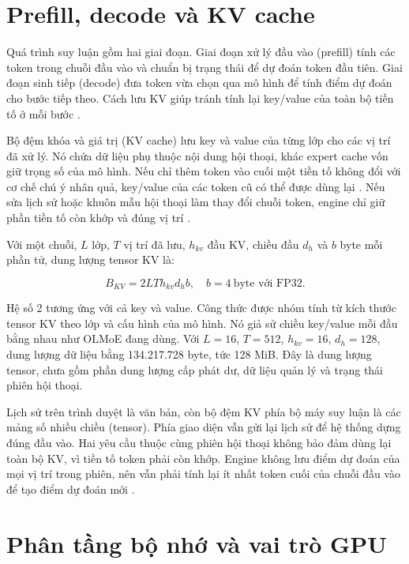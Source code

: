 \section{Prefill, decode và KV cache}

Quá trình suy luận gồm hai giai đoạn. Giai đoạn xử lý đầu vào (prefill) tính các token trong chuỗi đầu vào và chuẩn bị trạng thái để dự đoán token đầu tiên. Giai đoạn sinh tiếp (decode) đưa token vừa chọn qua mô hình để tính điểm dự đoán cho bước tiếp theo. Cách lưu KV giúp tránh tính lại key/value của toàn bộ tiền tố ở mỗi bước \cite{hf_kv_cache}.

Bộ đệm khóa và giá trị (KV cache) lưu key và value của từng lớp cho các vị trí đã xử lý. Nó chứa dữ liệu phụ thuộc nội dung hội thoại, khác expert cache vốn giữ trọng số của mô hình. Nếu chỉ thêm token vào cuối một tiền tố không đổi với cơ chế chú ý nhân quả, key/value của các token cũ có thể được dùng lại \cite{hf_kv_cache}. Nếu sửa lịch sử hoặc khuôn mẫu hội thoại làm thay đổi chuỗi token, engine chỉ giữ phần tiền tố còn khớp và đúng vị trí \cite{moe_tierengine_arch}.

Với một chuỗi, $L$ lớp, $T$ vị trí đã lưu, $h_{kv}$ đầu KV, chiều đầu $d_h$ và $b$ byte mỗi phần tử, dung lượng tensor KV là:

\begin{equation}
\label{eq:2.9}
B_{KV}=2LTh_{kv}d_hb,\quad b=4\ \text{byte với FP32}.
\end{equation}

Hệ số 2 tương ứng với cả key và value. Công thức được nhóm tính từ kích thước tensor KV theo lớp \cite{hf_kv_cache} và cấu hình của mô hình. Nó giả sử chiều key/value mỗi đầu bằng nhau như OLMoE đang dùng. Với $L=16$, $T=512$, $h_{kv}=16$, $d_h=128$, dung lượng dữ liệu bằng 134.217.728 byte, tức 128 MiB. Đây là dung lượng tensor, chưa gồm phần dung lượng cấp phát dư, dữ liệu quản lý và trạng thái phiên hội thoại.

Lịch sử trên trình duyệt là văn bản, còn bộ đệm KV phía bộ máy suy luận là các mảng số nhiều chiều (tensor). Phía giao diện vẫn gửi lại lịch sử để hệ thống dựng đúng đầu vào. Hai yêu cầu thuộc cùng phiên hội thoại không bảo đảm dùng lại toàn bộ KV, vì tiền tố token phải còn khớp. Engine không lưu điểm dự đoán của mọi vị trí trong phiên, nên vẫn phải tính lại ít nhất token cuối của chuỗi đầu vào để tạo điểm dự đoán mới \cite{moe_tierengine_arch}.

\section{Phân tầng bộ nhớ và vai trò GPU}

